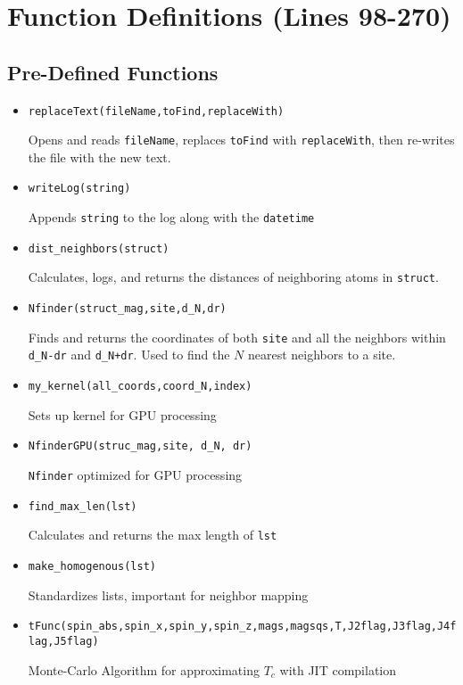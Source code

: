 \documentclass[12pt]{article}
\begin{document}
\section*{Function Definitions (Lines 98-270)}
\subsection*{Pre-Defined Functions}
\begin{itemize}
    \item \texttt{replaceText(fileName,toFind,replaceWith)} 
    
    
    Opens and reads \texttt{fileName}, replaces \texttt{toFind} with \texttt{replaceWith}, then re-writes the file with the new text. 
    
    \item \texttt{writeLog(string)} 
    
    Appends \texttt{string} to the log along with the \texttt{datetime}
    
    \item \texttt{dist_neighbors(struct)}
    
    Calculates, logs, and returns the distances of neighboring atoms in \texttt{struct}. 
    
    \item \texttt{Nfinder(struct_mag,site,d_N,dr)}
    
    Finds and returns the coordinates of both \texttt{site} and all the neighbors within \texttt{d_N-dr} and \texttt{d_N+dr}. Used to find the $N$ nearest neighbors to a site. 
    
    \item \texttt{my_kernel(all_coords,coord_N,index)}
    
    Sets up kernel for GPU processing
    
    \item \texttt{NfinderGPU(struc_mag,site, d_N, dr)}
    
    \texttt{Nfinder} optimized for GPU processing
    
    \item \texttt{find_max_len(lst)}
    
    Calculates and returns the max length of \texttt{lst}
    
    \item \texttt{make_homogenous(lst)}
    
    Standardizes lists, important for neighbor mapping
    \item \texttt{tFunc(spin_abs,spin_x,spin_y,spin_z,mags,magsqs,T,J2flag,J3flag,J4flag,J5flag)}
    
    Monte-Carlo Algorithm for approximating $T_c$ with JIT compilation
\end{itemize}
\end{document}
